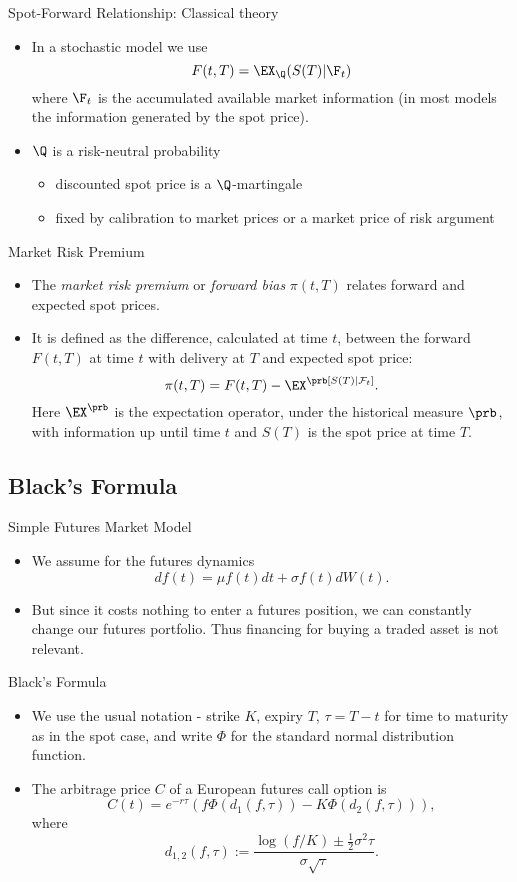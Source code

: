 {Spot-Forward Relationship: Classical theory}
\begin{itemize}
\item<1-> In a stochastic model we use
$$
F(t,T)=\EX_{\Q}(S(T)|\F_t)
$$
where $\F_t$ is the accumulated available market information (in most models the information generated by the spot price).
\item<2-> $\Q$ is a risk-neutral probability
\begin{itemize}
\item discounted spot price is a $\Q$-martingale
\item fixed by calibration to market prices or a market price of risk argument
\end{itemize}
\end{itemize}

{Market Risk Premium}
\begin{itemize}
\item<1-> The \emph{market risk premium} or \emph{forward bias} $\pi (t,T)$
relates forward and expected spot prices.
\item<2-> It is defined as the difference, calculated at time $t$, between
the forward $F(t,T)$ at time $t$ with delivery at $T$ and expected
spot price:
\begin{equation}\label{forward risk premium}
\pi(t,T)= F(t,T)-\EX^\prb[S(T)|\mathcal F_t].
\end{equation}
Here $\EX^\prb$ is the expectation operator, under the
historical measure $\prb$, with information up until time $t$ and
$S(T)$ is the spot price at time $T$.
\end{itemize}

\subsection{Black's Formula}

{Simple Futures Market Model}
\begin{itemize}
\item<1-> We assume for the futures dynamics
$$
df(t) = \mu f(t) dt + \sigma f(t) dW(t).
$$
\item<2-> But since it costs nothing to enter a futures position, we can constantly change our futures portfolio.
Thus financing for buying a traded asset is not relevant.
\end{itemize}

{Black's Formula}

\begin{itemize}
\item<1-> We use the usual notation -
strike $K$, expiry $T$, $\tau=T-t$ for time to maturity as in the spot case, and write $\Phi$ for the
standard normal distribution function.
\item<2->
The arbitrage price $C$ of a European futures call option is
\begin{equation}\label{Black}
C(t)= e^{-r\tau} (f \Phi(d_1 (f,\tau)) - K \Phi(d_2 (f,\tau))),
\end{equation}
where
$$
d_{1,2} (f,\tau) := \frac{\log (f/K) \pm \frac{1}{2} {\sigma}^2 \tau}{
\sigma \sqrt{\tau}}.
$$
\end{itemize}

